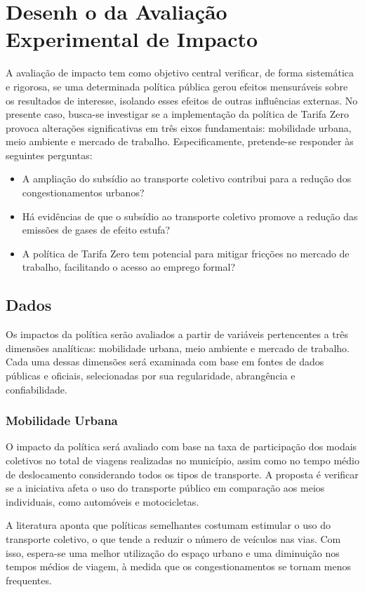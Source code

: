 
\section{Desenh
o da Avaliação Experimental de Impacto}
A avaliação de impacto tem como objetivo central verificar, de forma sistemática e rigorosa, se uma determinada política pública gerou efeitos mensuráveis sobre os resultados de interesse, isolando esses efeitos de outras influências externas. No presente caso, busca-se investigar se a implementação da política de Tarifa Zero provoca alterações significativas em três eixos fundamentais: mobilidade urbana, meio ambiente e mercado de trabalho. Especificamente, pretende-se responder às seguintes perguntas:

\begin{itemize} 
    \item A ampliação do subsídio ao transporte coletivo contribui para a redução dos congestionamentos urbanos? 
    \item Há evidências de que o subsídio ao transporte coletivo promove a redução das emissões de gases de efeito estufa? 
    \item A política de Tarifa Zero tem potencial para mitigar fricções no mercado de trabalho, facilitando o acesso ao emprego formal? 
\end{itemize}

\subsection{Dados}

Os impactos da política serão avaliados a partir de variáveis pertencentes a três dimensões analíticas: mobilidade urbana, meio ambiente e mercado de trabalho. Cada uma dessas dimensões será examinada com base em fontes de dados públicas e oficiais, selecionadas por sua regularidade, abrangência e confiabilidade.

\subsubsection{Mobilidade Urbana}
O impacto da política será avaliado com base na taxa de participação dos modais coletivos no total de viagens realizadas no município, assim como no tempo médio de deslocamento considerando todos os tipos de transporte. A proposta é verificar se a iniciativa afeta o uso do transporte público em comparação aos meios individuais, como automóveis e motocicletas.

A literatura aponta que políticas semelhantes costumam estimular o uso do transporte coletivo, o que tende a reduzir o número de veículos nas vias. Com isso, espera-se uma melhor utilização do espaço urbano e uma diminuição nos tempos médios de viagem, à medida que os congestionamentos se tornam menos frequentes.

